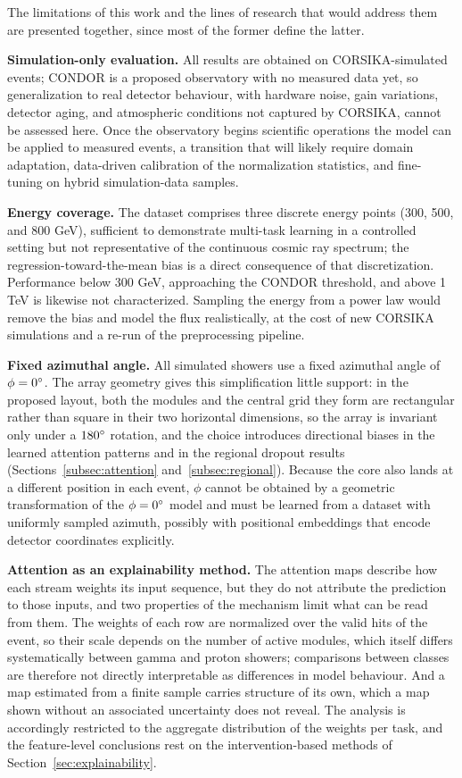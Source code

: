 The limitations of this work and the lines of research that would address them are presented together, since most of the former define the latter.

\textbf{Simulation-only evaluation.} All results are obtained on CORSIKA-simulated events; CONDOR is a proposed observatory with no measured data yet, so generalization to real detector behaviour, with hardware noise, gain variations, detector aging, and atmospheric conditions not captured by CORSIKA, cannot be assessed here. Once the observatory begins scientific operations the model can be applied to measured events, a transition that will likely require domain adaptation, data-driven calibration of the normalization statistics, and fine-tuning on hybrid simulation-data samples.

\textbf{Energy coverage.} The dataset comprises three discrete energy points (300, 500, and 800 GeV), sufficient to demonstrate multi-task learning in a controlled setting but not representative of the continuous cosmic ray spectrum; the regression-toward-the-mean bias is a direct consequence of that discretization. Performance below 300 GeV, approaching the CONDOR threshold, and above 1 TeV is likewise not characterized. Sampling the energy from a power law would remove the bias and model the flux realistically, at the cost of new CORSIKA simulations and a re-run of the preprocessing pipeline.

\textbf{Fixed azimuthal angle.} All simulated showers use a fixed azimuthal angle of $\phi = 0\degree$. The array geometry gives this simplification little support: in the proposed layout, both the modules and the central grid they form are rectangular rather than square in their two horizontal dimensions, so the array is invariant only under a $180\degree$ rotation, and the choice introduces directional biases in the learned attention patterns and in the regional dropout results (Sections~\ref{subsec:attention} and~\ref{subsec:regional}). Because the core also lands at a different position in each event, $\phi$ cannot be obtained by a geometric transformation of the $\phi = 0\degree$ model and must be learned from a dataset with uniformly sampled azimuth, possibly with positional embeddings that encode detector coordinates explicitly.

\textbf{Attention as an explainability method.} The attention maps describe how each stream weights its input sequence, but they do not attribute the prediction to those inputs, and two properties of the mechanism limit what can be read from them. The weights of each row are normalized over the valid hits of the event, so their scale depends on the number of active modules, which itself differs systematically between gamma and proton showers; comparisons between classes are therefore not directly interpretable as differences in model behaviour. And a map estimated from a finite sample carries structure of its own, which a map shown without an associated uncertainty does not reveal. The analysis is accordingly restricted to the aggregate distribution of the weights per task, and the feature-level conclusions rest on the intervention-based methods of Section~\ref{sec:explainability}.

